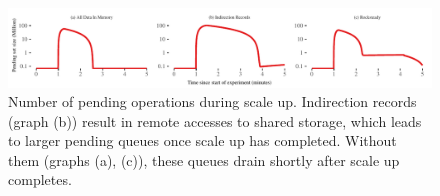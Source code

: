 \begin{figure}[t]
\centering
\includegraphics[width=1.0\textwidth]{graphs/comparison-pending.pdf}
\caption{Number of pending operations during scale up. Indirection
    records (graph (b)) result in remote accesses to shared storage,
    which leads to larger pending queues once scale up has completed.
    Without them (graphs (a), (c)), these queues drain shortly after
    scale up completes.}
\label{fig:comparison-pending}
\end{figure}
